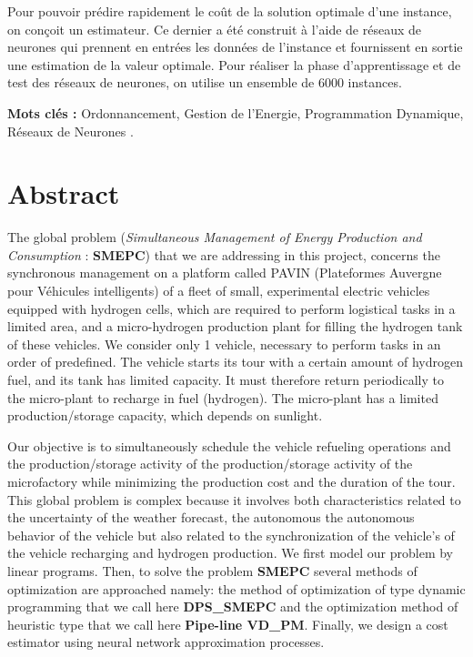\documentclass[11pt,a4paper]{report}
\begin{document}
Pour pouvoir prédire rapidement le coût de la solution optimale d'une instance, on conçoit un estimateur. Ce dernier a été construit à l'aide de réseaux de neurones qui prennent en entrées les données de l'instance et fournissent en sortie une estimation de la valeur optimale. Pour réaliser la phase d'apprentissage et de test des réseaux de neurones, on utilise un ensemble de 6000 instances.

\textbf{Mots clés :} Ordonnancement, Gestion de l'Energie, Programmation Dynamique, Réseaux de Neurones .  
\newpage
\chapter*{Abstract}
The global problem (\textit{Simultaneous Management of Energy Production and Consumption} : \textbf{SMEPC}) that
we are addressing in this project, concerns the synchronous management on a platform
called PAVIN (Plateformes Auvergne pour Véhicules intelligents) of a fleet of small, experimental
electric vehicles equipped with hydrogen cells, which are required to perform logistical tasks
in a limited area, and a micro-hydrogen production plant for filling the hydrogen tank
of these vehicles.
We consider only 1 vehicle, necessary to perform tasks in an order of
predefined. The vehicle starts its tour with a certain amount of hydrogen fuel, and its tank has
limited capacity. It must therefore return periodically to the micro-plant to recharge in
fuel (hydrogen). The micro-plant has a limited production/storage capacity, which depends on sunlight.

Our objective is to simultaneously schedule the vehicle refueling operations and the production/storage activity of the
production/storage activity of the microfactory while minimizing the production cost and the duration of the tour.
This global problem is complex because it involves both characteristics related to the uncertainty of the weather forecast, the autonomous
the autonomous behavior of the vehicle but also related to the synchronization of the vehicle's
of the vehicle recharging and hydrogen production.
We first model our problem by linear programs.
Then, to solve the problem \textbf{SMEPC} several methods of optimization are approached namely: the method of optimization of type
dynamic programming that we call here \textbf{DPS\_SMEPC} and the optimization method of heuristic type that we call here \textbf{Pipe-line VD\_PM}. Finally, we design a cost estimator using neural network approximation processes.
\end{document}
